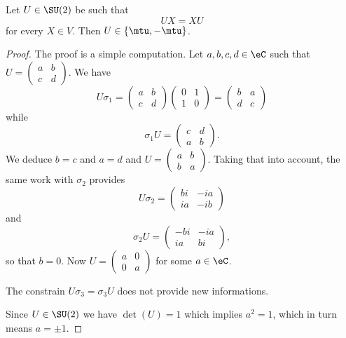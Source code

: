 \begin{proposition}       \label{PROPooHQENooUsQeiZ}
	Let \( U\in \SU(2)\) be such that
	\begin{equation}
		UX=XU
	\end{equation}
	for every \( X\in V\). Then \( U\in\{\mtu,-\mtu\}\).
\end{proposition}

\begin{proof}
	The proof is a simple computation. Let \( a,b,c,d\in \eC\) such that \( U=\begin{pmatrix}
		a & b \\
		c & d
	\end{pmatrix}\). We have
	\begin{equation}
		U\sigma_1=\begin{pmatrix}
			a & b \\
			c & d
		\end{pmatrix}\begin{pmatrix}
			0 & 1 \\
			1 & 0
		\end{pmatrix}=\begin{pmatrix}
			b & a \\
			d & c
		\end{pmatrix}
	\end{equation}
	while
	\begin{equation}
		\sigma_1U=\begin{pmatrix}
			c & d \\
			a & b
		\end{pmatrix}.
	\end{equation}
	We deduce \( b=c\) and \( a=d\) and \( U=\begin{pmatrix}
		a & b \\
		b & a
	\end{pmatrix}\). Taking that into account, the same work with \( \sigma_2\) provides
	\begin{equation}
		U\sigma_2=\begin{pmatrix}
			bi & -ia \\
			ia & -ib
		\end{pmatrix}
	\end{equation}
	and
	\begin{equation}
		\sigma_2U=\begin{pmatrix}
			-bi & -ia \\
			ia  & bi
		\end{pmatrix},
	\end{equation}
	so that \( b=0\). Now \( U=\begin{pmatrix}
		a & 0 \\
		0 & a
	\end{pmatrix}\) for some \( a\in \eC\).

	The constrain \( U\sigma_3=\sigma_3U\) does not provide new informations.

	Since \( U\in \SU(2)\) we have \( \det(U)=1\) which implies \( a^2=1\), which in turn means \( a=\pm1\).
\end{proof}

